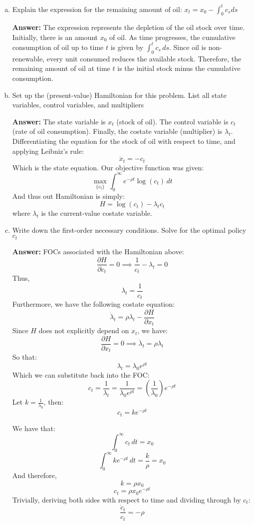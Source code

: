 \documentclass[11pt]{extarticle}
\theoremstyle{plain}
\theoremstyle{definition}
\begin{document}
\vspace{2mm}
\begin{enumerate}[(a)]
\item Explain the expression for the remaining amount of oil: $x_t = x_0 - \int_0^t c_s ds$

\textbf{Answer:} The expression represents the depletion of the oil stock over time. Initially, there is an amount $x_0$ of oil. As time progresses, the cumulative consumption of oil up to time $t$ is given by $\int_0^t c_s \, ds$. Since oil is non-renewable, every unit consumed reduces the available stock. Therefore, the remaining amount of oil at time $t$ is the initial stock minus the cumulative consumption.

\item Set up the (present-value) Hamiltonian for this problem. List all state variables, control variables, and multipliers

\textbf{Answer:} 
The state variable is $x_t$ (stock of oil). The control variable is $c_t$ (rate of oil consumption). Finally, the costate variable (multiplier) is $\lambda_t$.\\
Differentiating the equation for the stock of oil with respect to time, and applying Leibniz's rule:
\[
    \dot{x}_t = - c_t
\]
Which is the state equation. Our objective function was given:
\[
    \max_{\{c_t\}} \int_0^\infty e^{- \rho t} \log(c_t) \, dt
\]
And thus out Hamiltonian is simply:
\[
    H = \log(c_t) - \lambda_t c_t
\]
where $\lambda_t$ is the current-value costate variable.

\item Write down the first-order necessary conditions. Solve for the optimal policy $c_t$

\textbf{Answer:} 
FOCs associated with the Hamiltonian above:
\[
    \frac{\partial H}{\partial c_t} = 0 \implies \frac{1}{c_t} - \lambda_t = 0
\]
Thus,
\[
    \lambda_t = \frac{1}{c_t}
\]
Furthermore, we have the following costate equation:
\[
    \dot{\lambda}_t = \rho \lambda_t - \frac{\partial H}{\partial x_t}
\]
Since $H$ does not explicitly depend on $x_t$, we have:
\[
    \frac{\partial H}{\partial x_t} = 0 \implies \dot{\lambda}_t = \rho \lambda_t
\]
So that:
\[
    \lambda_t = \lambda_0 e^{\rho t}
\]
Which we can substitute back into the FOC:
\[
    c_t = \frac{1}{\lambda_t} = \frac{1}{\lambda_0 e^{\rho t}} = \left( \frac{1}{\lambda_0} \right) e^{- \rho t}
\]
Let $k = \frac{1}{\lambda_0}$, then:
\[
    c_t = k e^{- \rho t}
\]

We have that:
\[
    \int_0^\infty c_t \, dt = x_0
\]
\[
    \int_0^\infty k e^{- \rho t} \, dt = \frac{k}{\rho} = x_0
\]
And therefore,
\[
    k = \rho x_0
\]
\[
    c_t = \rho x_0 e^{- \rho t}
\]
Trivially, deriving both sides with respect to time and dividing through by $c_t$:
$$\frac{\dot c_t}{c_t} = -\rho$$


\end{enumerate}
\end{document}
